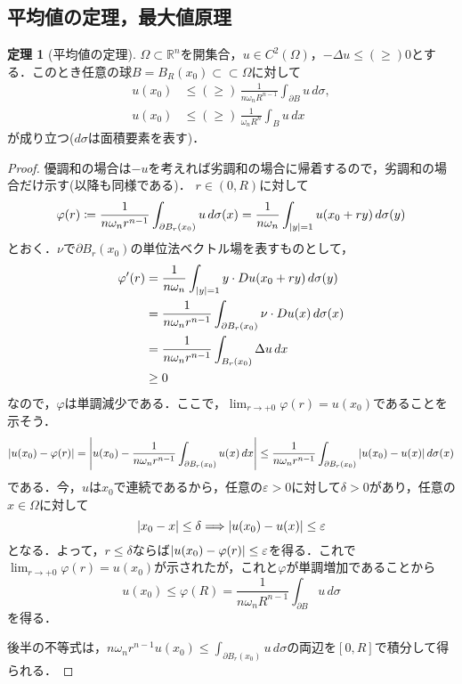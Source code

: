 \documentclass[a4paper]{ltjsarticle}
\newcommand{\Rset}{\mathbb{R}}
\newcommand{\ssubset}{\subset\subset}
\newcommand{\1}{\mathbbm{1}}
\numberwithin{equation}{section}
\theoremstyle{definition}
\newtheorem{thm}{定理}[section]
\begin{document}
\subsection{平均値の定理，最大値原理}
\begin{thm}[平均値の定理]\label{thm:meanvalue}
    $\Omega\subset \Rset^n$を開集合，$u\in C^2(\Omega)$，$-\Delta u\leq (\geq)0$とする．このとき任意の球$B=B_R(x_0)\ssubset \Omega$に対して
    \begin{align}
        u(x_0)&\leq (\geq)\,\frac{1}{n\omega_nR^{n-1}}\int_{\partial B}u\,d\sigma,\\
        u(x_0)&\leq (\geq)\,\frac{1}{\omega_nR^{n}}\int_{B}u\,dx
    \end{align}
    が成り立つ($d\sigma$は面積要素を表す)．
\end{thm}
\begin{proof}
    優調和の場合は$-u$を考えれば劣調和の場合に帰着するので，劣調和の場合だけ示す(以降も同様である)．
    $r\in (0,R)$に対して
    \begin{equation}
        \varphi(r)\coloneqq \frac{1}{n\omega_n r^{n-1}}\int_{\partial B_r(x_0)}u\,d\sigma(x)=\frac{1}{n\omega_n}\int_{\abs{y}=1}u(x_0+ry)\,d\sigma(y)
    \end{equation}
    とおく．$\nu$で$\partial B_r(x_0)$の単位法ベクトル場を表すものとして，
    \begin{align}
        \varphi'(r)&=\frac{1}{n\omega_n}\int_{\abs{y}=1}y\cdot Du(x_0+ry)\,d\sigma(y)\\
        &=\frac{1}{n\omega_nr^{n-1}}\int_{\partial B_r(x_0)}\nu\cdot Du(x)\,d\sigma(x)\\
        &=\frac{1}{n\omega_n r^{n-1}}\int_{B_r(x_0)}\Delta u\,dx\\
        &\geq0 
    \end{align}
    なので，$\varphi$は単調減少である．ここで，$\lim_{r\to +0}\varphi(r)=u(x_0)$であることを示そう．
    \begin{equation}
        \abs{u(x_0)-\varphi(r)}=\abs{u(x_0)-\frac{1}{n\omega_n r^{n-1}}\int_{\partial B_r(x_0)}u(x)\,dx}\leq \frac{1}{n\omega_n r^{n-1}}\int_{\partial B_r(x_0)}\abs{u(x_0)-u(x)}\,d\sigma(x)
    \end{equation}
    である．今，$u$は$x_0$で連続であるから，任意の$\varepsilon>0$に対して$\delta>0$があり，任意の$x\in \Omega$に対して 
    \begin{equation}
        \abs{x_0-x}\leq\delta\Longrightarrow \abs{u(x_0)-u(x)}\leq \varepsilon
    \end{equation}
    となる．よって，$r\leq \delta$ならば$\abs{u(x_0)-\varphi(r)}\leq\varepsilon$を得る．これで$\lim_{r\to+0}\varphi(r)=u(x_0)$が示されたが，これと$\varphi$が単調増加であることから
    \begin{equation}
        u(x_0)\leq \varphi(R)=\frac{1}{n\omega_nR^{n-1}}\int_{\partial B}u\,d\sigma
    \end{equation}
    を得る．

    後半の不等式は，$n\omega_n r^{n-1}u(x_0)\leq \int_{\partial B_r(x_0)}u\,d\sigma$の両辺を$[0,R]$で積分して得られる．
\end{proof}
\end{document}
